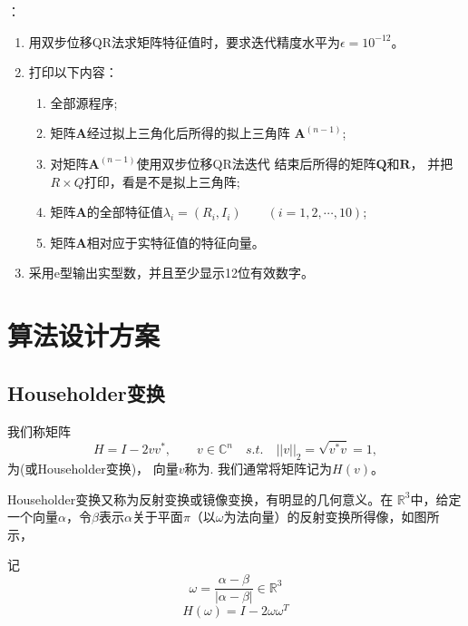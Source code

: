 ：
\begin{enumerate}
\item 用双步位移QR法求矩阵特征值时，要求迭代精度水平为$\epsilon=10^{-12}$。

\item 打印以下内容：

\begin{enumerate}
\item 全部源程序;

\item 矩阵$\bm{A}$经过拟上三角化后所得的拟上三角阵
$\bm{A}^{(n-1)}$;

\item 对矩阵$\bm{A}^{(n-1)}$使用双步位移QR法迭代
结束后所得的矩阵$\bm{Q}$和$\bm{R}$，
并把$R\times Q$打印，看是不是拟上三角阵;

\item 矩阵$\bm{A}$的全部特征值$\lambda_{i}=(R_i,I_i)\qquad (i=1,2,\cdots ,10)$;

\item 矩阵$\bm{A}$相对应于实特征值的特征向量。
\end{enumerate}
\item 采用e型输出实型数，并且至少显示12位有效数字。
\end{enumerate}



\newpage
\chapter{算法设计方案}
\section{Householder变换}

\begin{theo}
我们称矩阵
\begin{equation}
H=I-2vv^{\ast},\qquad v\in\mathbb{C}^n\quad s.t.
\quad ||v||_2=\sqrt{v^{\ast}v}=1,
\end{equation}
为(或Householder变换)，
向量$v$称为.
我们通常将矩阵记为$H(v)$。
\end{theo}

Householder变换又称为反射变换或镜像变换，有明显的几何意义。在
$\mathbb{R}^3$中，给定一个向量$\alpha$，令$\beta$表示$\alpha$关于平面$\pi$（以$\omega$为法向量）的反射变换所得像，如图所示，

记
\[\omega  = \frac{{\alpha  - \beta }}{{\left| {\alpha  - \beta } \right|}} \in {\mathbb{R}^3}\]
\[H(\omega ) = I - 2\omega {\omega ^T}\]

